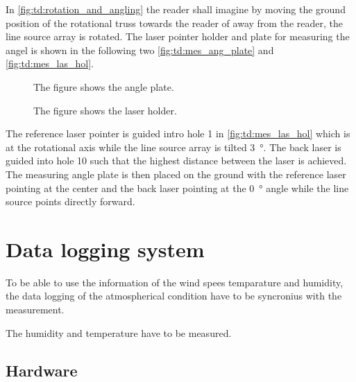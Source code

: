 In \autoref{fig:td:rotation_and_angling} the reader shall imagine by moving the ground position of the rotational truss towards the reader of away from the reader, the line source array is rotated. The laser pointer holder and plate for measuring the angel is shown in the following two \autoref{fig:td:mes_ang_plate} and \autoref{fig:td:mes_las_hol}.


\begin{figure}[H]
    \centering
     \captionsetup{width=1\linewidth}
    \begin{minipage}{0.36\textwidth}
        \centering
         \captionsetup{width=0.90\linewidth}
       
        \caption{The figure shows the angle plate.}
        \label{fig:td:mes_ang_plate}
    \end{minipage}%
    \begin{minipage}{0.56\textwidth}
        \centering
         \captionsetup{width=0.90\linewidth}
        
        \caption{The figure shows the laser holder.}
        \label{fig:td:mes_las_hol}
    \end{minipage}
\end{figure}


The reference laser pointer is guided intro hole 1 in \autoref{fig:td:mes_las_hol} which is at the rotational axis while the line source array is tilted \SI{3}{\degree}. The back laser is guided into hole 10 such that the highest distance between the laser is achieved. The measuring angle plate is then placed on the ground with the reference laser pointing at the center and the back laser pointing at the \SI{0}{\degree} angle while the line source points directly forward. 




\section{Data logging system} 
To be able to use the information of the wind spees temparature and humidity, the data logging of the atmospherical condition have to be syncronius with the measurement. 



The humidity and temperature have to be measured.


\subsection{Hardware}

